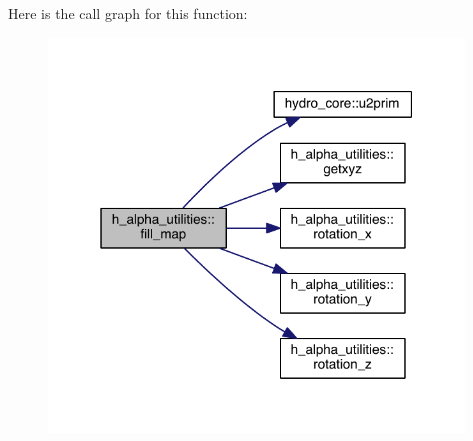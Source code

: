 Here is the call graph for this function\+:\nopagebreak
\begin{figure}[H]
\begin{center}
\leavevmode
\includegraphics[width=313pt]{namespaceh__alpha__utilities_aafc5cae88b562d0bd2d039cae21ed35a_cgraph}
\end{center}
\end{figure}


\hypertarget{namespaceh__alpha__utilities_af48cd3c223c292170bc1f90da256f537}{}

